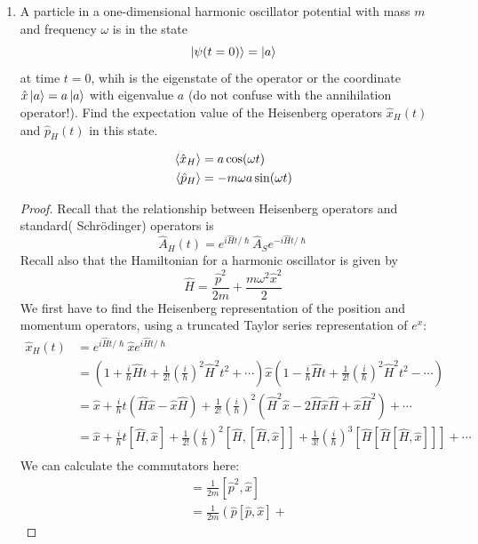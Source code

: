 \documentclass[a4paper]{article}
\begin{document}
\begin{enumerate}
\item A particle in a one-dimensional harmonic oscillator potential with
	mass $m$ and frequency $\omega$ is in the state
	\[ \left\lvert \psi(t=0)\right\rangle = \left\lvert a\right\rangle \] at time $t=0$, whih is the
	eigenstate of the operator or the coordinate \(\hat{x}\left\lvert a\right\rangle=
	a\left\lvert a\right\rangle\) with eigenvalue $a$ (do not confuse with the annihilation
	operator!). Find the expectation value of the Heisenberg operators
	$\hat{x}_H(t)$ and $\hat{p}_H(t)$ in this state.
\begin{ans}
	\begin{align*}
		\left\langle \hat{x}_H\right\rangle &= a\cos(\omega t)\\
		\left\langle \hat{p}_H\right\rangle &= -m\omega a\sin(\omega t)
	\end{align*}
\begin{proof}
	Recall that the relationship between Heisenberg operators and standard(
	Schr\"odinger) operators is
	\[\hat{A}_H(t) = e^{i\hat{H}t/\hslash}\hat{A}_Se^{-i\hat{H}t/\hslash}\]
	Recall also that the Hamiltonian for a harmonic oscillator is given by
	\[ \hat{H} = \frac{\hat{p}^2}{2m}+\frac{m\omega^2\hat{x}^2}{2} \]
	We first have to find the Heisenberg representation of the position
	and momentum operators, using a truncated Taylor series representation
	of $e^x$:
	\begin{align*}
		\hat{x}_H(t) &= e^{i\hat{H}t/\hslash}\hat{x}
		e^{i\hat{H}t/\hslash}\\
		&= \left(1+\frac{i}{\hslash}\hat{H}t +
		\frac{1}{2!}\left(\frac{i}{\hslash}\right)^2\hat{H}^2t^2 +
		\cdots\right)
		\hat{x}
		\left(1-\frac{i}{\hslash}\hat{H}t +
		\frac{1}{2!}\left(\frac{i}{\hslash}\right)^2\hat{H}^2t^2 -
		\cdots\right)\\
		&= \hat{x} + \frac{i}{\hslash}t(\hat{H}\hat{x}-\hat{x}\hat{H})
		+\frac{1}{2!}\left(\frac{i}{\hslash}\right)^2(\hat{H}^2\hat{x}
		-2\hat{H}\hat{x}\hat{H} + \hat{x}\hat{H}^2) + \cdots\\
		&= \hat{x} + \frac{i}{\hslash}t[\hat{H},\hat{x}] +
		\frac{1}{2!}\left(\frac{i}{\hslash}\right)^2
		\left[\hat{H},[\hat{H},\hat{x}]\right] + \frac{1}{3!}
		\left(\frac{i}{\hslash}\right)^3\left[\hat{H}\left[\hat{H}[
		\hat{H},\hat{x}]\right]\right] + \cdots\\
	\end{align*}
	We can calculate the commutators here:
	\begin{align*}
		[\hat{H},\hat{x}]&=\frac{1}{2m}[\hat{p}^2,\hat{x}]\\
				 &=\frac{1}{2m}\left(\hat{p}[\hat{p},\hat{x}]+

\end{align*}
\end{proof}
\end{ans}
\end{enumerate}
\end{document}
